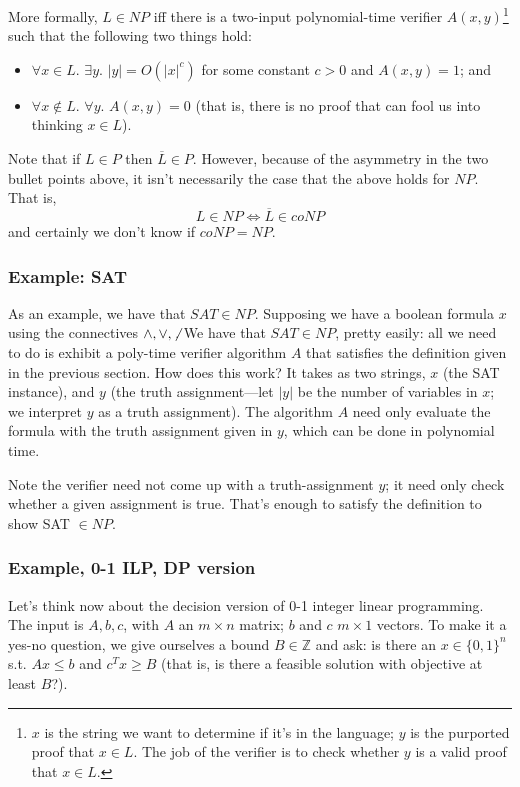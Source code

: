\documentclass{article}
\begin{document}
More formally, $L\in NP$ iff there is a two-input polynomial-time verifier
$A(x,y)$\footnote{$x$ is the string we want to determine if it's in the 
language; $y$ is the purported proof that $x\in L$. The job of the verifier 
is to check whether $y$ is a valid proof that $x\in L$.} 
such that the following two things hold:
\begin{itemize}
\item
$\forall x\in L.\,\, \exists y.\,\, |y| = O(|x|^c)$ for some constant $c> 0$
and $A(x,y) = 1$; and

\item
$\forall x\not\in L.\,\, \forall y.\,\, A(x,y) = 0$ (that is, there is no
proof that can fool us into thinking $x\in L$).
\end{itemize}

Note that if $L\in P$ then $\overline L\in P$.
However, because of the asymmetry in the two bullet points above, it isn't
necessarily the case that the above holds for $NP$.
That is,
$$
L\in NP \Leftrightarrow \overline L \in coNP
$$
and certainly we don't know if $coNP = NP$.

\subsubsection{Example: SAT}

As an example, we have that $SAT \in NP$.
Supposing we have a boolean formula $x$ using the connectives 
$\wedge, \vee, \not$.
We have that $SAT\in NP$, pretty easily: all we need to do is exhibit
a poly-time verifier algorithm $A$ that satisfies the definition given in the 
previous section.
How does this work? It takes as two strings, $x$ (the SAT instance), and
$y$ (the truth assignment---let $|y|$ be the number of variables in $x$;
we interpret $y$ as a truth assignment).
The algorithm $A$ need only evaluate the formula with the truth assignment
given in $y$, which can be done in polynomial time.

Note the verifier need not come up with a truth-assignment $y$; it need
only check whether a given assignment is true. That's enough to satisfy
the definition to show SAT $\in NP$.

\subsubsection{Example, 0-1 ILP, DP version}

Let's think now about the decision version of 0-1 integer linear programming.
The input is $A,b,c$, with $A$ an $m\times n$ matrix; 
$b$ and $c$ $m\times 1$ vectors.
To make it a yes-no question, we give ourselves a bound $B\in\mathbb Z$ and
ask: is there an $x\in \{0,1\}^n$ s.t.
$Ax\leq b$ and $c^Tx \geq B$ (that is, is there a feasible solution with
objective at least $B$?).
\end{document}
